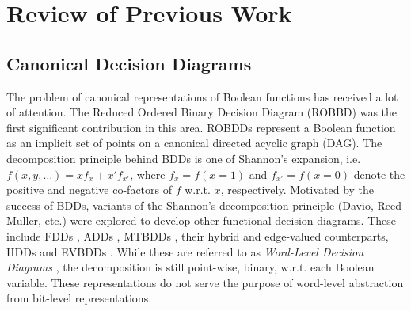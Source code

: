 \section{Review of Previous Work}
\label{sec:prev}

\subsection{Canonical Decision Diagrams}
The problem of canonical representations of Boolean functions has
received a lot of attention. The Reduced Ordered Binary Decision Diagram
(ROBBD) \cite{BRYA86} was the first significant contribution in this
area. 
ROBDDs represent a Boolean function as an implicit set of points on
a canonical directed acyclic graph (DAG). 
The decomposition principle behind BDDs is one of Shannon's expansion,
i.e. $f(x, y, \dots) = x f_x + x' f_{x'}$, where $f_x = f(x = 1)$ and
$f_{x'} = f(x = 0)$ denote the positive and negative co-factors of
$f$ w.r.t. $x$, respectively. Motivated by the success of BDDs, 
variants of the Shannon's decomposition principle (Davio,
Reed-Muller, etc.) were explored to develop other functional decision
diagrams. These include FDDs \cite{okfdd}, ADDs \cite{add}, MTBDDs
\cite{mtbdd}, their hybrid and edge-valued counterparts, HDDs
\cite{hdd} and EVBDDs \cite{evbdd}. While these are
referred to as {\it Word-Level Decision Diagrams} \cite{WLS}, the
decomposition is still point-wise, binary, 
w.r.t. each Boolean variable. These representations do not
serve the purpose of word-level abstraction from bit-level
representations. 

